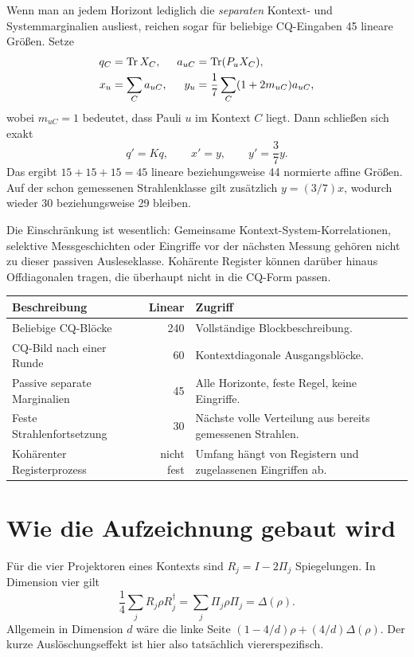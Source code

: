 Wenn man an jedem Horizont lediglich die \emph{separaten} Kontext- und Systemmarginalien ausliest, reichen sogar für beliebige CQ-Eingaben 45 lineare Größen. Setze
\begin{align}
q_C&=\operatorname{Tr} X_C,&a_{uC}&=\operatorname{Tr}(P_uX_C),\\
x_u&=\sum_Ca_{uC},&y_u&=\frac17\sum_C(1+2m_{uC})a_{uC},
\end{align}
wobei $m_{uC}=1$ bedeutet, dass Pauli $u$ im Kontext $C$ liegt. Dann schließen sich exakt
\begin{equation}
q'=Kq,\qquad x'=y,\qquad y'=\frac37y.
\end{equation}
Das ergibt $15+15+15=45$ lineare beziehungsweise 44 normierte affine Größen. Auf der schon gemessenen Strahlenklasse gilt zusätzlich $y=(3/7)x$, wodurch wieder 30 beziehungsweise 29 bleiben. 

Die Einschränkung ist wesentlich: Gemeinsame Kontext-System-Korrelationen, selektive Messgeschichten oder Eingriffe vor der nächsten Messung gehören nicht zu dieser passiven Ausleseklasse. Kohärente Register können darüber hinaus Offdiagonalen tragen, die überhaupt nicht in die CQ-Form passen.

\par\noindent\begin{tabularx}{\linewidth}{L{56mm}rY}
\toprule
\textbf{Beschreibung}&\textbf{Linear}&\textbf{Zugriff}\\\midrule
Beliebige CQ-Blöcke&240&Vollständige Blockbeschreibung.\\
CQ-Bild nach einer Runde&60&Kontextdiagonale Ausgangsblöcke.\\
Passive separate Marginalien&45&Alle Horizonte, feste Regel, keine Eingriffe.\\
Feste Strahlenfortsetzung&30&Nächste volle Verteilung aus bereits gemessenen Strahlen.\\
Kohärenter Registerprozess&nicht fest&Umfang hängt von Registern und zugelassenen Eingriffen ab.\\\bottomrule
\end{tabularx}\par

\section{Wie die Aufzeichnung gebaut wird}
Für die vier Projektoren eines Kontexts sind $R_j=I-2\Pi_j$ Spiegelungen. In Dimension vier gilt
\begin{equation}
\frac14\sum_jR_j\rho R_j^\dagger=\sum_j\Pi_j\rho\Pi_j=\Delta(\rho).
\end{equation}
Allgemein in Dimension $d$ wäre die linke Seite $(1-4/d)\rho+(4/d)\Delta(\rho)$. Der kurze Auslöschungseffekt ist hier also tatsächlich viererspezifisch.

